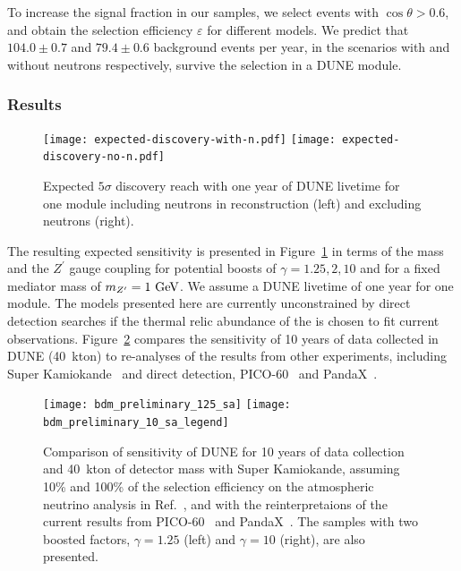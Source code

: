 To increase the signal fraction in our samples, we select events with $\cos\theta > 0.6$,
and obtain the selection efficiency $\varepsilon$ for different  models.
We predict that $104.0 \pm 0.7$ and $79.4 \pm 0.6$ background events per year, in the scenarios with and without neutrons respectively, survive the selection in a DUNE \nominalmodsize module.

\subsubsection{Results}

\begin{figure}[!htb]
\centering
\texttt{[image: expected-discovery-with-n.pdf]}\hspace{0.05\textwidth}
\texttt{[image: expected-discovery-no-n.pdf]}
\caption[Expected $5\sigma$ discovery reach with one year of DUNE livetime]{Expected $5\sigma$ discovery reach with one year of DUNE livetime for one \nominalmodsize module including neutrons in reconstruction (left) and excluding neutrons (right).\label{fig:significance}}
\end{figure}
The resulting expected sensitivity is presented in Figure~\ref{fig:significance} in terms of the  mass and the $Z^\prime$ gauge coupling for potential  boosts of $\gamma = 1.25,2,10$ and for a fixed mediator mass of $m_{Z^\prime} = 1~{\rm GeV}$.  We assume a DUNE livetime of one year for one \nominalmodsize module.  The models presented here are currently unconstrained by direct detection searches if the thermal relic abundance of the  is chosen to fit current observations.
Figure~\ref{fig:bdm_sensitivity_comparison} compares the sensitivity of 10 years of data collected in DUNE (40~kton) to re-analyses of the results from other experiments, including Super Kamiokande~\cite{Fechner:2009aa} and  direct detection, PICO-60~\cite{Amole:2019fdf} and PandaX~\cite{Xia:2018qgs}. 

\begin{figure}[!htb]
\centering
\texttt{[image: bdm\_preliminary\_125\_sa]}\hspace{0.05\textwidth}
\texttt{[image: bdm\_preliminary\_10\_sa\_legend]}
\caption[Comparison of DUNE (10 yr) sensitivity to \superk sensitivity]{Comparison of sensitivity of DUNE for 10 years of data collection and 40~kton of detector mass with Super Kamiokande, assuming 10\% and 100\% of the selection efficiency on the atmospheric neutrino analysis in Ref.~\cite{Fechner:2009aa}, and with the reinterpretaions of the current results from PICO-60~\cite{Amole:2019fdf} and PandaX~\cite{Xia:2018qgs}.  The samples with two boosted factors, $\gamma = 1.25$ (left) and $\gamma = 10$ (right), are also presented. \label{fig:bdm_sensitivity_comparison}}
\end{figure}

